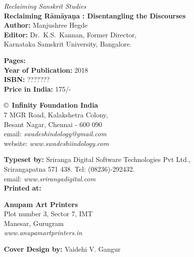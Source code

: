 \thispagestyle{empty}
\noindent
{\fontsize{9}{11}\selectfont\sl Reclaiming Sanskrit Studies}\\
{\bf Reclaiming Rāmāyaṇa : Disentangling the Discourses}\\ 
{\bf Author:} Manjushree Hegde\\
{\bf Editor:} Dr.\ K.S.\ Kannan, Former Director,\\ 
Karnataka Samskrit University, Bangalore.
\vfill

\noindent
{\bf Pages:} \pageref{book:end}\\
{\bf Year of Publication:} 2018\\
{\bf ISBN:} ???????\\
{\bf Price in India:} 175/-
\vfill

\noindent
\copyright\ {\bf Infinity Foundation India}\\ 
7 MGR Road, Kalakshetra Colony,\\ 
Besant Nagar, Chennai - 600 090\\
email: {\sl swadeshindology@gmail.com}\\
website: {\sl www.swadeshiindology.com} 
\vfill

\noindent
{\bf Typeset by:} Sriranga Digital Software Technologies Pvt Ltd.,\\ 
Srirangapatna 571 438. Tel: (08236)-292432.\\
email: {\sl www.srirangadigital.com}\\

\noindent
{\bf Printed at:}

\noindent
{\bf Anupam Art Printers}\\
Plot number 3, Sector 7, IMT\\
Manesar, Gurugram\\
{\sl www.anupamartprinters.in}

\medskip
\noindent
{\bf Cover Design by:} Vaidehi V. Gangur
